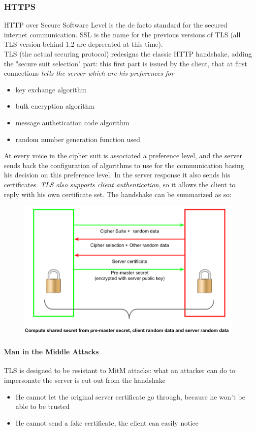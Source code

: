 \documentclass{article}
\begin{document}
			\subsubsection{HTTPS}
				HTTP over Secure Software Level is the de facto standard for the secured internet communication. SSL is the name for the previous versions of TLS (all TLS version behind 1.2 are deprecated at this time).\\
				TLS (the actual securing protocol) redesigns the classic HTTP handshake, adding the "secure suit selection" part: this first part is issued by the client, that at first connections \emph{tells the server which are his preferences for}
				\begin{itemize}
					\item key exchange algorithm
					\item bulk encryption algorithm
					\item message authetication code algorithm
					\item random number generation function used
				\end{itemize}
				At every voice in the cipher suit is associated a preference level, and the server sends back the configuration of algorithms to use for the communication basing his decision on this preference level. In the server response it also sends his certificates. \emph{TLS also supports client authentication}, so it allows the client to reply with his own certificate set. The handshake can be summarized as so:
				\begin{figure}[H]
					\centering
					\includegraphics[width = \textwidth]{./images/TLS.png}
				\end{figure}
				
				\paragraph{Man in the Middle Attacks}
					TLS is designed to be resistant to MitM attacks: what an attacker can do to impersonate the server is cut out from the handshake
					\begin{itemize}
						\item He cannot let the original server certificate go through, because he won't be able to be trusted
						\item He cannot send a fake certificate, the client can easily notice
					\end{itemize}
	
\end{document}
